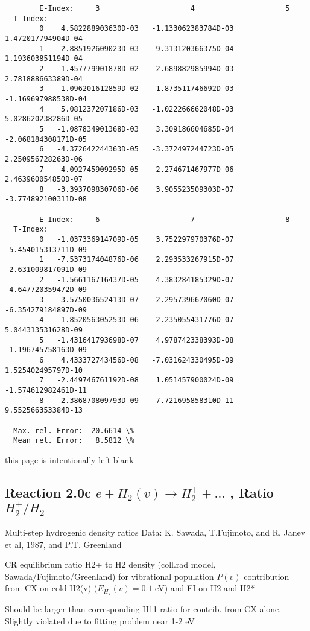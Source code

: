 \documentclass[12pt,dvipdfmx]{article}
\begin{document}
{\begin{small}
\begin{verbatim}
        E-Index:     3                     4                     5
  T-Index:
        0    4.582288903630D-03   -1.133062383784D-03    1.472017794904D-04
        1    2.885192609023D-03   -9.313120366375D-04    1.193603851194D-04
        2    1.457779901878D-02   -2.689882985994D-03    2.781888663389D-04
        3   -1.096201612859D-02    1.873511746692D-03   -1.169697988538D-04
        4    5.081237207186D-03   -1.022266662048D-03    5.028620238286D-05
        5   -1.087834901368D-03    3.309186604685D-04   -2.068184308171D-05
        6   -4.372642244363D-05   -3.372497244723D-05    2.250956728263D-06
        7    4.092745909295D-05   -2.274671467977D-06    2.463960054850D-07
        8   -3.393709830706D-06    3.905523509303D-07   -3.774892100311D-08

        E-Index:     6                     7                     8
  T-Index:
        0   -1.037336914709D-05    3.752297970376D-07   -5.454015313711D-09
        1   -7.537317404876D-06    2.293533267915D-07   -2.631009817091D-09
        2   -1.566116716437D-05    4.383284185329D-07   -4.647720359472D-09
        3    3.575003652413D-07    2.295739667060D-07   -6.354279184897D-09
        4    1.852056305253D-06   -2.235055431776D-07    5.044313531628D-09
        5   -1.431641793698D-07    4.978742338393D-08   -1.196745758163D-09
        6    4.433372743456D-08   -7.031624330495D-09    1.525402495797D-10
        7   -2.449746761192D-08    1.051457900024D-09   -1.574612982461D-11
        8    2.386870809793D-09   -7.721695858310D-11    9.552566353384D-13

  Max. rel. Error:  20.6614 \%
  Mean rel. Error:   8.5812 \%

\end{verbatim}\end{small}
\newpage
this page is intentionally left blank
\texttt{}
\newpage

\subsection{
Reaction 2.0c   $e +  H_2(v) \rightarrow H_2^+ + ... $ , Ratio \ $H_2^+/H_2$
}
 Multi-step hydrogenic density ratios
 Data: K. Sawada, T.Fujimoto, \cite{kn:Sawada} and R. Janev et al, 1987, and P.T. Greenland


  CR equilibrium ratio H2+ to H2 density
  (coll.rad model, Sawada/Fujimoto/Greenland) for vibrational population $P(v)$
  contribution from CX on cold H2(v) ($E_{H_2}(v)=0.1$ eV) and EI on H2 and H2*


Should be larger than corresponding H11 ratio for contrib. from CX alone.
Slightly violated due to fitting problem near 1-2 eV

}
\end{document}

